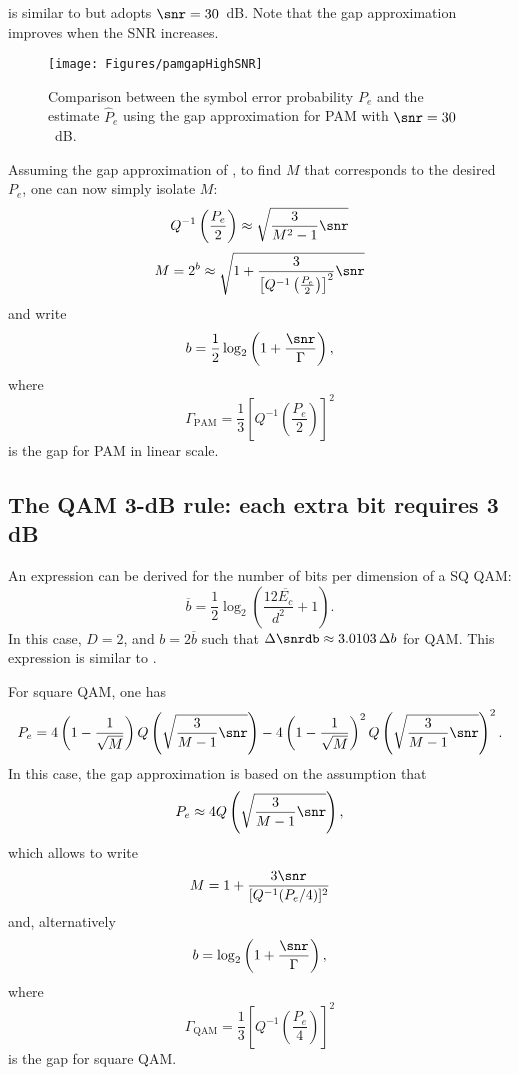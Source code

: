  is similar to  but adopts $\snr=30$~dB. Note that the gap approximation improves when the SNR increases.

\begin{figure}[htbp]
\centering
\texttt{[image: Figures/pamgapHighSNR]}
\caption{Comparison between the symbol error probability $P_e$ and the estimate $\hat P_e$ using the gap approximation for PAM with $\snr = 30$~dB.\label{fig:pamgapHighSNR}}
\end{figure}

Assuming the gap approximation of , to find $M$ that corresponds to the desired $P_e$, one can now simply isolate $M$:
	$$Q^{-1} \left( \frac {{P}_e}  2 \right) \approx \sqrt{\frac{3}{M^2-1}\snr} $$
	$$M = 2^{{b}} \approx \sqrt{ 1 + \frac {3} {\left[ Q^{-1} \left( \frac {{P}_e}  2 \right) \right]^2} \snr}$$
	and write
	$${b} = \frac 1 2 \log_2 \left(1 + \frac{\snr}{\Gamma} \right),$$
	where
\begin{equation}
\Gamma_{\textrm{PAM}} = \frac 1 3 \left[ Q^{-1} \left( \frac {{P}_e}  2 \right) \right]^2
\label{eq:gap_pam}
\end{equation}		
is the gap for PAM in linear scale.

\subsection{The QAM 3-dB rule: each extra bit requires 3 dB}

An expression can be derived for the number of bits per dimension of a SQ QAM:
\[
\overline b = \frac 1 2 \log_2 \left(  \frac{12 \overline{E_c} }{d^2}+1  \right).
\]
In this case, $D=2$, and $b=2 \overline b$ such that $\Delta \snrdb \approx 3.0103 \, \Delta b$ for QAM.
This expression is similar to .

For square QAM, one has
\begin{equation}
P_e = 4 \left( 1 - \frac 1 {\sqrt{M}} \right) Q \left( \sqrt{\frac{3}{M-1} \snr} \right) - 4 \left(1 - \frac 1 {\sqrt{M}} \right)^2 Q \left( \sqrt{\frac{3}{M-1} \snr} \right)^2.
\label{eq:pe_qam}
\end{equation}
In this case, the gap approximation is based on the assumption that
\begin{equation}
P_e \approx 4  Q \left( \sqrt{\frac{3}{M-1}\snr}  \right),
\label{eq:pe_qam_gap}
\end{equation}
which allows to write
$$
M = 1 + \frac{3 \snr}{[Q^{-1}(P_e/4)]^2}
$$
and, alternatively
$$
b = \log_2 \left(1 + \frac{\snr}{\Gamma} \right),
$$
where
\begin{equation}
\Gamma_{\textrm{QAM}} = \frac{1}{3} \left[ Q^{-1} \left( \frac {{P}_e}  4 \right) \right]^2
\label{eq:gap_qam}
\end{equation}		
is the gap for square QAM.

